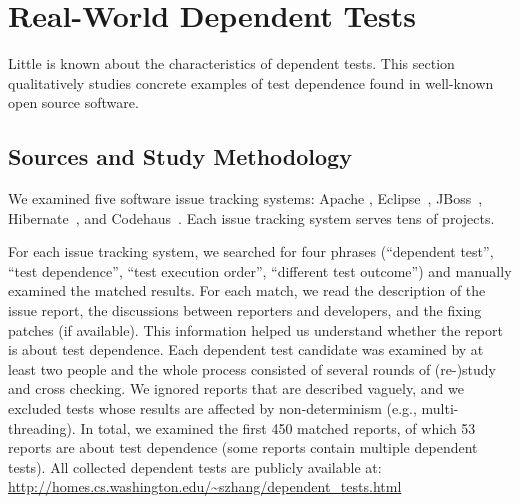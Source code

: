 \section{Real-World Dependent Tests}
\label{sec:study}

\newcommand{\unum}{{{14}}\xspace}
\newcommand{\svratio}{{{61}}}
\newcommand{\svnum}{{{59}}\xspace}
\newcommand{\unfixed}{{{58}}\xspace}


Little is known about the characteristics of dependent tests.
This section qualitatively studies
concrete examples of test dependence found in
well-known open source software. 


\subsection{Sources and Study Methodology}

We examined five
software issue
tracking systems: Apache \cite{apachebug},
Eclipse~\cite{eclipsebug}, JBoss~\cite{jbossbug},
Hibernate~\cite{hibernatebug}, and Codehaus~\cite{codehausbug}.
Each issue tracking system serves tens of projects.

For each issue tracking system, we searched for four phrases
(``dependent test'', ``test dependence'', ``test execution order'',
``different test outcome'') and manually examined the matched results. For each match, we read the
description of the issue report, the discussions between reporters
and developers, and the fixing patches (if available). This information
helped us understand whether the report is about test dependence.
Each dependent test candidate was examined by
at least two people and the whole process consisted of several
rounds of (re-)study and cross checking. We ignored reports
that are described vaguely, and we excluded tests whose results are
affected by non-determinism (e.g., multi-threading).
In total, we examined the first 450 matched reports, of which 53
reports are about test dependence (some reports contain multiple
dependent tests).
All collected dependent tests are publicly available 
at: \url{http://homes.cs.washington.edu/~szhang/dependent\_tests.html}


